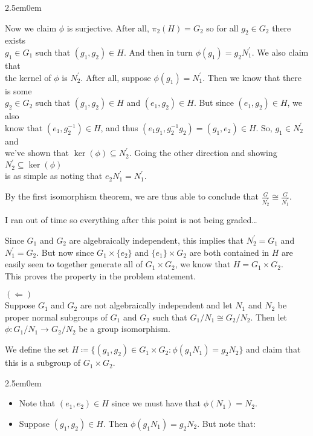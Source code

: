 \documentclass{book}
\newcommand{\HexTwoP}{%
   \color{RedViolet}%
   \fontsize{12}{13}\selectfont%
}
\newenvironment{myIndent}{%
   \begin{adjustwidth}{2.5em}{0em}%
}{%
   \end{adjustwidth}%
}
\newcommand{\retTwo}{\hfill\bigbreak}
\begin{document}
\begin{enumerate}
\begin{myIndent}
		Now we claim $\phi$ is surjective. After all, $\pi_2(H) = G_2$ so for all $g_2 \in G_2$ there exists\\ [1pt] $g_1 \in G_1$ such that $(g_1, g_2) \in H$. And then in turn $\phi(g_1) = g_2 N_1^\prime$. We also claim that\\ [1pt] the kernel of $\phi$ is $N_2^\prime$. After all, suppose $\phi(g_1) = N_1^\prime$. Then we know that there is some\\ [1pt] $g_2 \in G_2$ such that $(g_1, g_2) \in H$ and $(e_1, g_2) \in H$. But since $(e_1, g_2) \in H$, we also\\ [1pt] know that $(e_1, g_2^{-1}) \in H$, and thus $(e_1g_1, g_2^{-1}g_2) = (g_1, e_2) \in H$. So, $g_1 \in N_2^\prime$ and\\ [1pt] we've shown that $\ker(\phi) \subseteq N_2^\prime$. Going the other direction and showing $N_2^\prime \subseteq \ker(\phi)$\\ [1pt] is as simple as noting that $e_2N_1^\prime = N_1^\prime$.\newpage

		By the first isomorphism theorem, we are thus able to conclude that $\frac{G}{N_2^\prime} \cong \frac{G}{N_1^\prime}$.\retTwo

		{\color{red}I ran out of time so everything after this point is not being graded\dots\retTwo}

		Since $G_1$ and $G_2$ are algebraically independent, this implies that $N_2^\prime = G_1$ and\\ $N_1^\prime = G_2$. But now since $G_1 \times \{e_2\}$ and $\{e_1\} \times G_2$ are both contained in $H$ are\\ easily seen to together generate all of $G_1 \times G_2$, we know that $H = G_1 \times G_2$.\\ This proves the property in the problem statement.\retTwo

		$(\Longleftarrow)$\\
		Suppose $G_1$ and $G_2$ are not algebraically independent and let $N_1$ and $N_2$ be\\ proper normal subgroups of $G_1$ and $G_2$ such that $G_1 / N_1 \cong G_2 / N_2$. Then let\\ $\phi : G_1 / N_1 \to G_2 / N_2$ be a group isomorphism.\retTwo

		We define the set $H \coloneqq \{(g_1, g_2) \in G_1 \times G_2 : \phi(g_1N_1) = g_2N_2\}$ and claim that\\ this is a subgroup of $G_1 \times G_2$.
		\begin{myIndent}\HexTwoP
			\begin{itemize}
				\item Note that $(e_1, e_2) \in H$ since we must have that $\phi(N_1) = N_2$.\\ [-6pt]
				\item Suppose $(g_1, g_2) \in H$. Then $\phi(g_1 N_1) = g_2 N_2$. But note that:
				

\end{itemize}
\end{myIndent}
\end{myIndent}
\end{enumerate}
\end{document}
